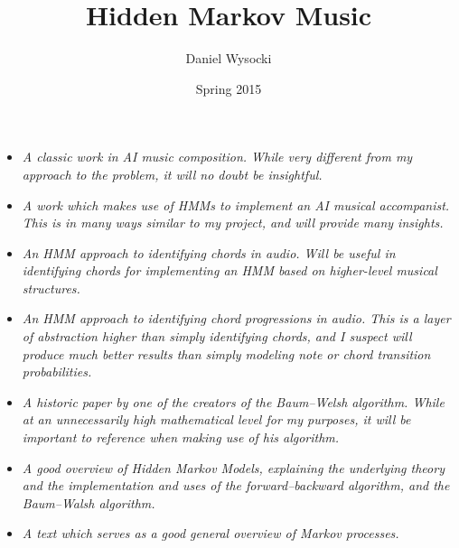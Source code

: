 \documentclass[12pt]{article}
\author{Daniel Wysocki}
\title{Hidden Markov Music}
\date{Spring 2015}
\begin{document}
\maketitle


\begin{itemize}

\item {}

\emph{
  A classic work in AI music composition. While very different from my
  approach to the problem, it will no doubt be insightful.
}


\item {}

\emph{
  A work which makes use of HMMs to implement an AI musical accompanist.
  This is in many ways similar to my project, and will provide many insights.
}


\item {}

\emph{
  An HMM approach to identifying chords in audio. Will be useful in identifying
  chords for implementing an HMM based on higher-level musical structures.
}


\item {}

\emph{
  An HMM approach to identifying chord \emph{progressions} in audio. This is a
  layer of abstraction higher than simply identifying chords, and I suspect
  will produce much better results than simply modeling note or chord
  transition probabilities.
}


\item {}

\emph{
  A historic paper by one of the creators of the Baum--Welsh algorithm.
  While at an unnecessarily high mathematical level for my purposes, it will
  be important to reference when making use of his algorithm.
}


\item {}

\emph{
  A good overview of Hidden Markov Models, explaining the underlying theory and
  the implementation and uses of the forward--backward algorithm, and the
  Baum--Walsh algorithm.
}


\item {}

\emph{
  A text which serves as a good general overview of Markov processes.
}




\end{itemize}
\end{document}

